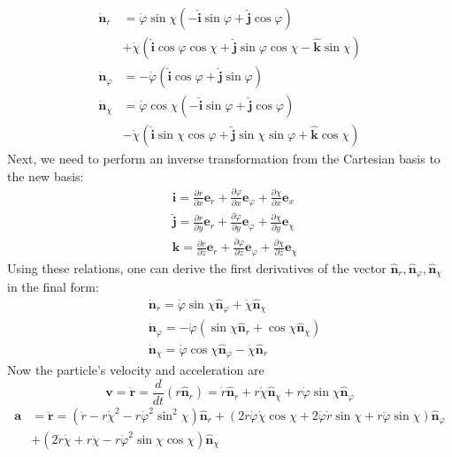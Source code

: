 $$
\begin{aligned}
\dot{\mathbf{n}}_{r} &=\dot{\varphi} \sin \chi(-\hat{\mathbf{i}} \sin \varphi+\hat{\mathbf{j}} \cos \varphi) \\
&+\dot{\chi}(\hat{\mathbf{i}} \cos \varphi \cos \chi+\hat{\mathbf{j}} \sin \varphi \cos \chi-\hat{\mathbf{k}} \sin \chi) \\
\dot{\mathbf{n}}_{\varphi} &=-\dot{\varphi}(\hat{\mathbf{i}} \cos \varphi+\hat{\mathbf{j}} \sin \varphi) \\
\dot{\mathbf{n}}_{\chi} &=\dot{\varphi} \cos \chi(-\hat{\mathbf{i}} \sin \varphi+\hat{\mathbf{j}} \cos \varphi) \\
&-\dot{\chi}(\hat{\mathbf{i}} \sin \chi \cos \varphi+\hat{\mathbf{j}} \sin \chi \sin \varphi+\hat{\mathbf{k}} \cos \chi)
\end{aligned}
$$
Next, we need to perform an inverse transformation from the Cartesian basis to the new basis:
$$
\begin{aligned}
&\hat{\mathbf{i}}=\frac{\partial r}{\partial x} \mathbf{e}_{r}+\frac{\partial \varphi}{\partial x} \mathbf{e}_{\varphi}+\frac{\partial \chi}{\partial x} \mathbf{e}_{x}\\
&\hat{\mathbf{j}}=\frac{\partial r}{\partial y} \mathbf{e}_{r}+\frac{\partial \varphi}{\partial y} \mathbf{e}_{\varphi}+\frac{\partial \chi}{\partial y} \mathbf{e}_{\chi}\\
&\mathbf{k}=\frac{\partial r}{\partial z} \mathbf{e}_{r}+\frac{\partial \varphi}{\partial z} \mathbf{e}_{\varphi}+\frac{\partial \chi}{\partial z} \mathbf{e}_{\chi}
\end{aligned}
$$
Using these relations, one can derive the first derivatives of the vector $\hat{\mathbf{n}}_{r}, \hat{\mathbf{n}}_{\varphi}, \hat{\mathbf{n}}_{\chi}$ in the final form:
$$
\begin{aligned}
&\dot{\mathbf{n}}_{r}=\dot{\varphi} \sin \chi \hat{\mathbf{n}}_{\varphi}+\dot{\chi} \hat{\mathbf{n}}_{\chi}\\
&\dot{\mathbf{n}}_{\varphi}=-\dot{\varphi}\left(\sin \chi \hat{\mathbf{n}}_{r}+\cos \chi \hat{\mathbf{n}}_{\chi}\right)\\
&\dot{\mathbf{n}}_{\chi}=\dot{\varphi} \cos \chi \hat{\mathbf{n}}_{\varphi}-\dot{\chi} \hat{\mathbf{n}}_{r}
\end{aligned}
$$
Now the particle's velocity and acceleration are
\begin{equation}
\mathbf{v}=\dot{\mathbf{r}}=\frac{d}{d t}\left(r \hat{\mathbf{n}}_{r}\right)=\dot{r} \hat{\mathbf{n}}_{r}+r \dot{\chi} \hat{\mathbf{n}}_{\chi}+r \dot{\varphi} \sin \chi \hat{\mathbf{n}}_{\varphi}
\end{equation}
\begin{equation}
\begin{aligned}
\mathbf{a} &=\ddot{\mathbf{r}}=\left(\ddot{r}-r \dot{\chi}^{2}-r \dot{\varphi}^{2} \sin ^{2} \chi\right) \hat{\mathbf{n}}_{r}+(2 r \dot{\varphi} \dot{\chi} \cos \chi+2 \dot{\varphi} \dot{r} \sin \chi+r \ddot{\varphi} \sin \chi) \hat{\mathbf{n}}_{\varphi} \\
&+\left(2 \dot{r} \dot{\chi}+r \ddot{\chi}-r \dot{\varphi}^{2} \sin \chi \cos \chi\right) \hat{\mathbf{n}}_{\chi}
\end{aligned}
\end{equation}

